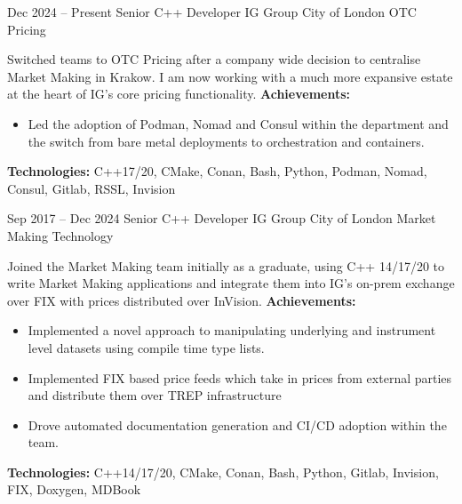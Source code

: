 \cventry
{Dec 2024 -- Present}
{Senior C++ Developer}
{IG Group}
{City of London}
{OTC Pricing}
{
    Switched teams to OTC Pricing after a company wide decision to centralise
    Market Making in Krakow. I am now working with a much more expansive estate
    at the heart of IG's core pricing functionality.
    \newline{}
    \textbf{Achievements:}{
	    \begin{itemize}
		    \item{
                Led the adoption of Podman, Nomad and Consul within the department
                and the switch from bare metal deployments to orchestration and
                containers.
            }
	    \end{itemize}
    }
    \textbf{Technologies:}{
        \scriptsize 
            C++17/20, CMake, Conan, Bash, Python, Podman, Nomad, Consul, Gitlab,
            RSSL, Invision
        \newline{} 
    }
}

\cventry
{Sep 2017 -- Dec 2024}
{Senior C++ Developer}
{IG Group}
{City of London}
{Market Making Technology}
{
    Joined the Market Making team initially as a graduate, using C++ 14/17/20 to
    write Market Making applications and integrate them into IG's on-prem exchange
    over FIX with prices distributed over InVision.
    \newline{}
    \textbf{Achievements:}{
	    \begin{itemize}
		    \item{
                Implemented a novel approach to manipulating underlying and
                instrument level datasets using compile time type lists.
            }
		    \item{
                Implemented FIX based price feeds which take in prices from
                external parties and distribute them over TREP infrastructure
            }
            \item{
                Drove automated documentation generation and CI/CD adoption
                within the team.
            }
	    \end{itemize}
    }
    \textbf{Technologies:}{
        \scriptsize 
            C++14/17/20, CMake, Conan, Bash, Python, Gitlab, Invision, FIX, Doxygen,
            MDBook
        \newline{} 
    }
}


